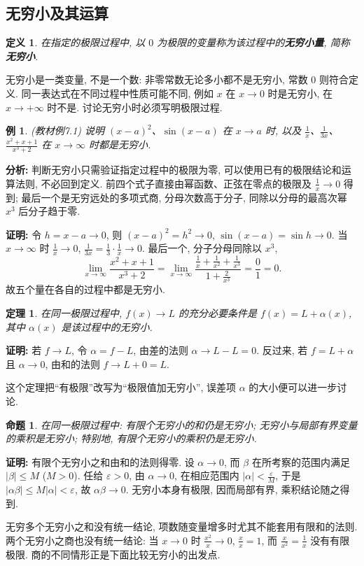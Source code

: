 \documentclass[UTF8,openany]{ctexbook}
\theoremstyle{chinesetextbook}
\newtheorem{definition}{定义}[section]
\newtheorem{example}{例}[section]
\newtheorem{proposition}{命题}[section]
\newenvironment{cnproof}{\par\indent\textbf{证明:} \ignorespaces}{\par}
\newtheorem*{theoremsingle}{定理}
\begin{document}
\subsection{无穷小及其运算}
\begin{definition}
在指定的极限过程中, 以 $0$ 为极限的变量称为该过程中的\textbf{无穷小量}, 简称\textbf{无穷小}.
\end{definition}
无穷小是一类变量, 不是一个数: 非零常数无论多小都不是无穷小, 常数 $0$ 则符合定义. 同一表达式在不同过程中性质可能不同, 例如 $x$ 在 $x\to0$ 时是无穷小, 在 $x\to+\infty$ 时不是. 讨论无穷小时必须写明极限过程.
\begin{example}
\textnormal{(教材例7.1)} 说明 $(x-a)^2$、$\sin(x-a)$ 在 $x\to a$ 时, 以及 $\displaystyle \frac1x$、$\displaystyle \frac1{3x}$、$\displaystyle \frac{x^2+x+1}{x^3+2}$ 在 $x\to\infty$ 时都是无穷小.
\end{example}
\par\indent\textbf{分析:} 判断无穷小只需验证指定过程中的极限为零, 可以使用已有的极限结论和运算法则, 不必回到定义. 前四个式子直接由幂函数、正弦在零点的极限及 $\displaystyle\frac1x\to0$ 得到; 最后一个是无穷远处的多项式商, 分母次数高于分子, 同除以分母的最高次幂 $x^3$ 后分子趋于零.
\begin{cnproof}
令 $h=x-a\to0$, 则 $(x-a)^2=h^2\to0$, $\sin(x-a)=\sin h\to0$. 当 $x\to\infty$ 时 $\displaystyle\frac1x\to0$, $\displaystyle\frac1{3x}=\frac13\cdot\frac1x\to0$. 最后一个, 分子分母同除以 $x^3$,
\[
\lim_{x\to\infty}\frac{x^2+x+1}{x^3+2}
=\lim_{x\to\infty}\frac{\frac1x+\frac1{x^2}+\frac1{x^3}}{1+\frac2{x^3}}
=\frac{0}{1}=0.
\]
故五个量在各自的过程中都是无穷小.
\end{cnproof}
\begin{theoremsingle}
在同一极限过程中, $f(x)\to L$ 的充分必要条件是 $f(x)=L+\alpha(x)$, 其中 $\alpha(x)$ 是该过程中的无穷小.
\end{theoremsingle}
\begin{cnproof}
若 $f\to L$, 令 $\alpha=f-L$, 由差的法则 $\alpha\to L-L=0$. 反过来, 若 $f=L+\alpha$ 且 $\alpha\to0$, 由和的法则 $f\to L+0=L$.
\end{cnproof}
这个定理把“有极限”改写为“极限值加无穷小”, 误差项 $\alpha$ 的大小便可以进一步讨论.
\begin{proposition}
在同一极限过程中: 有限个无穷小的和仍是无穷小; 无穷小与局部有界变量的乘积是无穷小; 特别地, 有限个无穷小的乘积仍是无穷小.
\end{proposition}
\begin{cnproof}
有限个无穷小之和由和的法则得零. 设 $\alpha\to0$, 而 $\beta$ 在所考察的范围内满足 $|\beta|\le M$ ($M>0$). 任给 $\varepsilon>0$, 由 $\alpha\to0$, 在相应范围内 $\displaystyle|\alpha|<\frac\varepsilon M$, 于是 $|\alpha\beta|\le M|\alpha|<\varepsilon$, 故 $\alpha\beta\to0$. 无穷小本身有极限, 因而局部有界, 乘积结论随之得到.
\end{cnproof}
无穷多个无穷小之和没有统一结论, 项数随变量增多时尤其不能套用有限和的法则. 两个无穷小之商也没有统一结论: 当 $x\to0$ 时 $\displaystyle\frac{x^2}x\to0$, $\displaystyle\frac xx=1$, 而 $\displaystyle\frac x{x^2}=\frac1x$ 没有有限极限. 商的不同情形正是下面比较无穷小的出发点.
\end{document}
